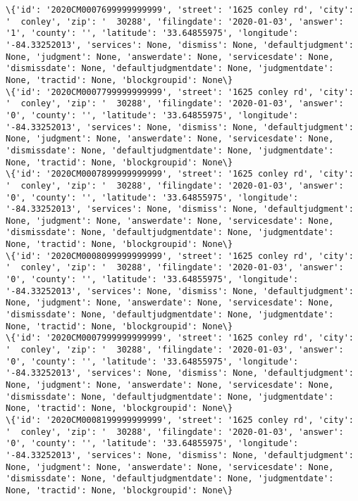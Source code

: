 \documentclass[11pt]{article}
\begin{document}
\begin{Verbatim}[commandchars=\\\{\}]
\{'id': '2020CM0007699999999999', 'street': '1625 conley rd', 'city': '  conley', 'zip': '  30288', 'filingdate': '2020-01-03', 'answer': '1', 'county': '', 'latitude': '33.64855975', 'longitude': '-84.33252013', 'services': None, 'dismiss': None, 'defaultjudgment': None, 'judgment': None, 'answerdate': None, 'servicesdate': None, 'dismissdate': None, 'defaultjudgmentdate': None, 'judgmentdate': None, 'tractid': None, 'blockgroupid': None\}
\{'id': '2020CM0007799999999999', 'street': '1625 conley rd', 'city': '  conley', 'zip': '  30288', 'filingdate': '2020-01-03', 'answer': '0', 'county': '', 'latitude': '33.64855975', 'longitude': '-84.33252013', 'services': None, 'dismiss': None, 'defaultjudgment': None, 'judgment': None, 'answerdate': None, 'servicesdate': None, 'dismissdate': None, 'defaultjudgmentdate': None, 'judgmentdate': None, 'tractid': None, 'blockgroupid': None\}
\{'id': '2020CM0007899999999999', 'street': '1625 conley rd', 'city': '  conley', 'zip': '  30288', 'filingdate': '2020-01-03', 'answer': '0', 'county': '', 'latitude': '33.64855975', 'longitude': '-84.33252013', 'services': None, 'dismiss': None, 'defaultjudgment': None, 'judgment': None, 'answerdate': None, 'servicesdate': None, 'dismissdate': None, 'defaultjudgmentdate': None, 'judgmentdate': None, 'tractid': None, 'blockgroupid': None\}
\{'id': '2020CM0008099999999999', 'street': '1625 conley rd', 'city': '  conley', 'zip': '  30288', 'filingdate': '2020-01-03', 'answer': '0', 'county': '', 'latitude': '33.64855975', 'longitude': '-84.33252013', 'services': None, 'dismiss': None, 'defaultjudgment': None, 'judgment': None, 'answerdate': None, 'servicesdate': None, 'dismissdate': None, 'defaultjudgmentdate': None, 'judgmentdate': None, 'tractid': None, 'blockgroupid': None\}
\{'id': '2020CM0007999999999999', 'street': '1625 conley rd', 'city': '  conley', 'zip': '  30288', 'filingdate': '2020-01-03', 'answer': '0', 'county': '', 'latitude': '33.64855975', 'longitude': '-84.33252013', 'services': None, 'dismiss': None, 'defaultjudgment': None, 'judgment': None, 'answerdate': None, 'servicesdate': None, 'dismissdate': None, 'defaultjudgmentdate': None, 'judgmentdate': None, 'tractid': None, 'blockgroupid': None\}
\{'id': '2020CM0008199999999999', 'street': '1625 conley rd', 'city': '  conley', 'zip': '  30288', 'filingdate': '2020-01-03', 'answer': '0', 'county': '', 'latitude': '33.64855975', 'longitude': '-84.33252013', 'services': None, 'dismiss': None, 'defaultjudgment': None, 'judgment': None, 'answerdate': None, 'servicesdate': None, 'dismissdate': None, 'defaultjudgmentdate': None, 'judgmentdate': None, 'tractid': None, 'blockgroupid': None\}

\end{Verbatim}
\end{document}
